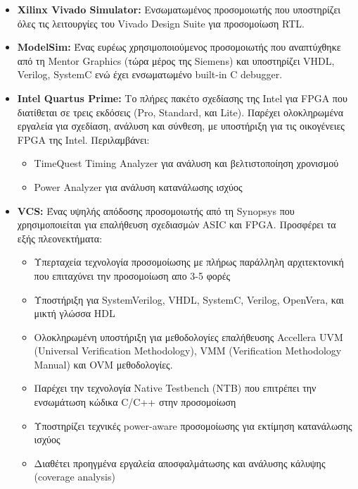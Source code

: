 \begin{itemize}
  \item \textbf{Xilinx Vivado Simulator:} Ενσωματωμένος προσομοιωτής που υποστηρίζει όλες τις λειτουργίες του Vivado Design Suite για προσομοίωση RTL.
  
  \item \textbf{ModelSim:} Ένας ευρέως χρησιμοποιούμενος προσομοιωτής που αναπτύχθηκε από τη Mentor Graphics (τώρα μέρος της Siemens) και υποστηρίζει VHDL, Verilog, SystemC ενώ έχει ενσωματωμένο built-in C debugger.
  
  \item \textbf{Intel Quartus Prime:} Το πλήρες πακέτο σχεδίασης της Intel για FPGA που διατίθεται σε τρεις εκδόσεις (Pro, Standard, και Lite). Παρέχει ολοκληρωμένα εργαλεία για σχεδίαση, ανάλυση και σύνθεση, με υποστήριξη για τις οικογένειες FPGA της Intel. Περιλαμβάνει:
    \begin{itemize}
      \item TimeQuest Timing Analyzer για ανάλυση και βελτιστοποίηση χρονισμού
      \item Power Analyzer για ανάλυση κατανάλωσης ισχύος
    \end{itemize}
  
    \item \textbf{VCS:} Ένας υψηλής απόδοσης προσομοιωτής από τη Synopsys που χρησιμοποιείται για επαλήθευση σχεδιασμών ASIC και FPGA. Προσφέρει τα εξής πλεονεκτήματα:
      \begin{itemize}
        \item Υπερταχεία τεχνολογία προσομοίωσης με πλήρως παράλληλη αρχιτεκτονική που επιταχύνει την προσομοίωση απο 3-5 φορές
        \item Υποστήριξη για SystemVerilog, VHDL, SystemC, Verilog, OpenVera, και μικτή γλώσσα HDL
        \item Ολοκληρωμένη υποστήριξη για μεθοδολογίες επαλήθευσης Accellera UVM (Universal Verification Methodology), VMM (Verification Methodology Manual) και  OVM μεθοδολογίες.
        \item Παρέχει την τεχνολογία Native Testbench (NTB) που επιτρέπει την ενσωμάτωση κώδικα C/C++ στην προσομοίωση
        \item Υποστηρίζει τεχνικές power-aware προσομοίωσης για εκτίμηση κατανάλωσης ισχύος
        \item Διαθέτει προηγμένα εργαλεία αποσφαλμάτωσης και ανάλυσης κάλυψης (coverage analysis)
      \end{itemize}


\end{itemize}

